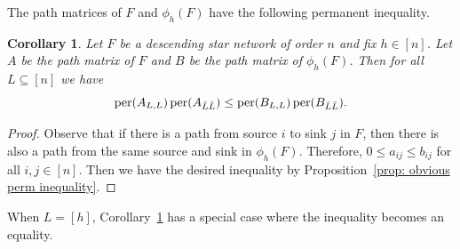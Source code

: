 \documentclass[12pt]{amsart}
\newtheorem{cor}[thm]{Corollary}
\theoremstyle{definition}
\numberwithin{equation}{section}
\DeclareMathOperator{\perm}{per}
\begin{document}
The path matrices of $F$ and $\phi_h(F)$ have the following permanent inequality.

\begin{cor}\label{more ones implies greater per}
    Let $F$ be a descending star network of order $n$ and fix $h\in[n]$.
    Let $A$ be the path matrix of $F$ and $B$ be the path matrix of $\phi_h(F)$. Then for all $L \subseteq [n]$ we have \begin{equation*}
        \perm(A_{L,L})\perm(A_{\Bar{L}\Bar{L}})\leq \perm(B_{L,L})\perm(B_{\Bar{L}\Bar{L}}).
    \end{equation*}
\end{cor}

\begin{proof}
    Observe that if there is a path from source $i$ to sink $j$ in $F$, then there is also a path from the same source and sink in $\phi_h(F)$. Therefore, $0\leq a_{ij}\leq b_{ij}$ for all $i,j\in[n]$. Then we have the desired inequality by Proposition~\ref{prop: obvious perm inequality}.
 \end{proof}

 When $L=[h]$, Corollary~\ref{more ones implies greater per} has a special case where the inequality becomes an equality.
\end{document}
